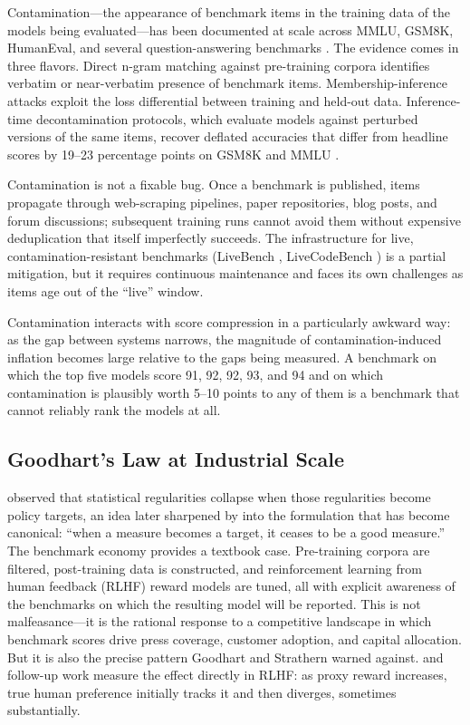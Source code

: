 \documentclass[11pt,a4paper]{article}
\begin{document}
Contamination---the appearance of benchmark items in the training data of the models being evaluated---has been documented at scale across MMLU, GSM8K, HumanEval, and several question-answering benchmarks \citep{sainz2023nlp,jacovi2023stop,golchin2024timetravel,xu2024benchmark}. The evidence comes in three flavors. Direct n-gram matching against pre-training corpora identifies verbatim or near-verbatim presence of benchmark items. Membership-inference attacks exploit the loss differential between training and held-out data. Inference-time decontamination protocols, which evaluate models against perturbed versions of the same items, recover deflated accuracies that differ from headline scores by 19--23 percentage points on GSM8K and MMLU \citep{sun2024contamination}.

Contamination is not a fixable bug. Once a benchmark is published, items propagate through web-scraping pipelines, paper repositories, blog posts, and forum discussions; subsequent training runs cannot avoid them without expensive deduplication that itself imperfectly succeeds. The infrastructure for live, contamination-resistant benchmarks (LiveBench \citep{white2024livebench}, LiveCodeBench \citep{jain2024livecodebench}) is a partial mitigation, but it requires continuous maintenance and faces its own challenges as items age out of the ``live'' window.

Contamination interacts with score compression in a particularly awkward way: as the gap between systems narrows, the magnitude of contamination-induced inflation becomes large relative to the gaps being measured. A benchmark on which the top five models score 91, 92, 92, 93, and 94 and on which contamination is plausibly worth 5--10 points to any of them is a benchmark that cannot reliably rank the models at all.

\subsection{Goodhart's Law at Industrial Scale}
\label{sec:goodhart}

\citet{goodhart1975} observed that statistical regularities collapse when those regularities become policy targets, an idea later sharpened by \citet{strathern1997} into the formulation that has become canonical: ``when a measure becomes a target, it ceases to be a good measure.'' The benchmark economy provides a textbook case. Pre-training corpora are filtered, post-training data is constructed, and reinforcement learning from human feedback (RLHF) reward models are tuned, all with explicit awareness of the benchmarks on which the resulting model will be reported. This is not malfeasance---it is the rational response to a competitive landscape in which benchmark scores drive press coverage, customer adoption, and capital allocation. But it is also the precise pattern Goodhart and Strathern warned against. \citet{openai2022goodhart} and follow-up work measure the effect directly in RLHF: as proxy reward increases, true human preference initially tracks it and then diverges, sometimes substantially.
\end{document}
